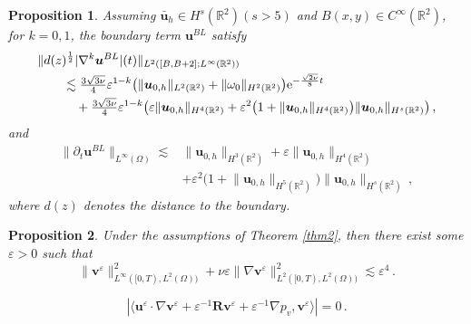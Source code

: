 \documentclass[10pt,a4paper]{amsart}
\newtheorem{proposition}{Proposition}
\begin{document}
\begin{proposition}\label{propBL}
	Assuming $\bar{\boldsymbol{u}}_h\in H^s(\mathbb{R}^2)(s>5)$ and $B(x,y)\in C^\infty(\mathbb{R}^2)$, for $k=0,1$, the boundary term $\boldsymbol{u}^{BL}$  satisfy
	\begin{align*} 
		&\lVert d(z)^{\frac{1}{2}} |\nabla^k\boldsymbol{u}^{BL}|(t) \rVert_{{L}^2([B,B+2];{L}^\infty(\mathbb{R}^2))}
		\\
		&\qquad\lesssim
		\tfrac{3\sqrt{3\nu}}{4}
		\varepsilon^{1-k}
		\big(
		\lVert{\boldsymbol{u}}_{0,h}\rVert_{L^2(\mathbb{R}^2)}+\lVert{\omega}_0\rVert_{H^2(\mathbb{R}^2)}	
		\big)\mathrm{e}^{-\frac{\sqrt{2\nu}}{8}  t}
		\notag\\
		&\qquad\quad+\tfrac{3\sqrt{3\nu}}{4}
		\varepsilon^{1-k}
		\big(
		\varepsilon
		\lVert {\boldsymbol{u}}_{0,h} \rVert_{H^{4}(\mathbb{R}^2)}+
		\varepsilon^2
		\big(
		1+
		\lVert {\boldsymbol{u}}_{0,h} \rVert_{H^{4}(\mathbb{R}^2)}
		\big)
		\lVert {\boldsymbol{u}}_{0,h} \rVert_{H^{s}(\mathbb{R}^2)}
		\big)\,,
	\end{align*}
	and
	\begin{align*} 
		\lVert \partial_t\boldsymbol{u}^{BL} \rVert_{L^\infty(\Omega)}
		\lesssim
		&\lVert{\boldsymbol{u}}_{0,h}\rVert_{H^{3}(\mathbb{R}^2)}
		+\varepsilon
		\lVert{\boldsymbol{u}}_{0,h}\rVert_{H^{4}(\mathbb{R}^2)}\\
		&+\varepsilon^2
		\big(
		1+
		\lVert {\boldsymbol{u}}_{0,h} \rVert_{H^{5}(\mathbb{R}^2)}
		\big)\lVert {\boldsymbol{u}}_{0,h} \rVert_{H^{s}(\mathbb{R}^2)}\,,
	\end{align*}	
	where $d(z)$ denotes the distance to the boundary.
\end{proposition}

\begin{proposition}\label{prop5}
	Under the assumptions of Theorem \ref{thm2}, then there exist some $\varepsilon>0$ such that
	\begin{equation}\label{4.1}
		\lVert\boldsymbol v^{\varepsilon}\rVert^2_{L^\infty([0,T),{L}^2(\Omega))}
		+\nu\varepsilon\lVert\nabla\boldsymbol v^{\varepsilon}\rVert^2_{L^2([0,T),{L}^2(\Omega))}
		\lesssim\varepsilon^4\,.
	\end{equation} 
\end{proposition}

	\begin{equation}\label{4.4}
		|\langle{\boldsymbol u}^{\varepsilon} \cdot \nabla {\boldsymbol v}^{\varepsilon}
		+	{\varepsilon}^{-1}\boldsymbol{R}\boldsymbol v^{\varepsilon}
		+		{\varepsilon}^{-1}\nabla p_v,{\boldsymbol v}^{\varepsilon}\rangle|=0\,.	
	\end{equation}
\end{document}
